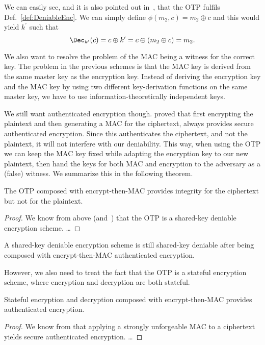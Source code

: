 We can easily see, and it is also pointed out in~\cite{deniablecrypt}, that the 
\ac{OTP} fulfils Def.~\ref{def:DeniableEnc}.
We can simply define \(\phi( m_2, c ) = m_2\oplus c\) and this would yield 
\(k^\prime\) such that \[
  \Dec_{k^\prime}( c ) = c\oplus k^\prime = c\oplus ( m_2\oplus c ) = m_2.
\]

We also want to resolve the problem of the \ac{MAC} being a witness for the 
correct key.
The problem in the previous schemes is that the \ac{MAC} key is derived from 
the same master key as the encryption key.
Instead of deriving the encryption key and the \ac{MAC} key by using two 
different key-derivation functions on the same master key, we have to use 
information-theoretically independent keys.

We still want authenticated encryption though.
\citet{AuthEncJournal} proved that first encrypting the plaintext and then 
generating a \ac{MAC} for the ciphertext, always provides secure authenticated 
encryption.
Since this authenticates the ciphertext, and not the plaintext, it will not 
interfere with our deniability.
This way, when using the \ac{OTP} we can keep the \ac{MAC} key fixed while 
adapting the encryption key to our new plaintext, then hand the keys for both 
\ac{MAC} and encryption to the adversary as a (false) witness.
We summarize this in the following theorem.

\begin{lemma}\label{lem:StillDeniable}
  The \ac{OTP} composed with encrypt-then-MAC provides integrity for the 
  ciphertext but not for the plaintext.
\end{lemma}
\begin{proof}
  We know from above (and~\cite{DeniableEncryption}) that the \ac{OTP} is 
  a shared-key deniable encryption scheme.
  \dots
\end{proof}

\begin{corollary}
  A shared-key deniable encryption scheme is still shared-key deniable after 
  being composed with encrypt-then-MAC authenticated encryption.
\end{corollary}

However, we also need to treat the fact that the \ac{OTP} is a stateful 
encryption scheme, where encryption and decryption are both stateful.

\begin{lemma}\label{lem:OTPIntegrity}
  Stateful encryption and decryption composed with encrypt-then-MAC provides 
  authenticated encryption.
\end{lemma}
\begin{proof}
  We know from \citet{AuthEncryption} that applying a strongly unforgeable 
  \ac{MAC} to a ciphertext yields secure authenticated encryption.
  \dots
\end{proof}


